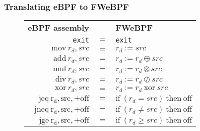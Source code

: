 \subsubsection{Translating eBPF to FWeBPF}

\begin{figure}[H]
  \centering
  \begin{tabular}{rcl}
    \textbf{eBPF assembly} & & \textbf{FWeBPF} \\
    \texttt{exit} & $=$ & \texttt{exit} \\
    $\mathrm{mov} ~ r_d, src$ & $=$ & $r_d := src$ \\
    $\mathrm{add} ~ r_d, src$ & $=$ & $r_d := r_d \oplus src$ \\
    $\mathrm{mul} ~ r_d, src$ & $=$ & $r_d := r_d \otimes src$ \\        
    $\mathrm{div} ~ r_d, src$ & $=$ & $r_d := r_d \oslash src$ \\
    $\mathrm{xor} ~ r_d, src$ & $=$ & $r_d := r_d ~ \mathrm{xor} ~ src$ \\            
    $\mathrm{jeq ~ r_d, src, +off}$ & $=$ & $\mathrm{if} ~ (r_d = src) ~ \mathrm{then} ~ \mathrm{off}$ \\
    $\mathrm{jneq ~ r_d, src, +off}$ & $=$ & $\mathrm{if} ~ (r_d \neq src) ~ \mathrm{then} ~ \mathrm{off}$ \\
    $\mathrm{jge ~ r_d, src, +off}$ & $=$ & $\mathrm{if} ~ (r_d \geq src) ~ \mathrm{then} ~ \mathrm{off}$    \\    
\end{tabular}
\end{figure}


